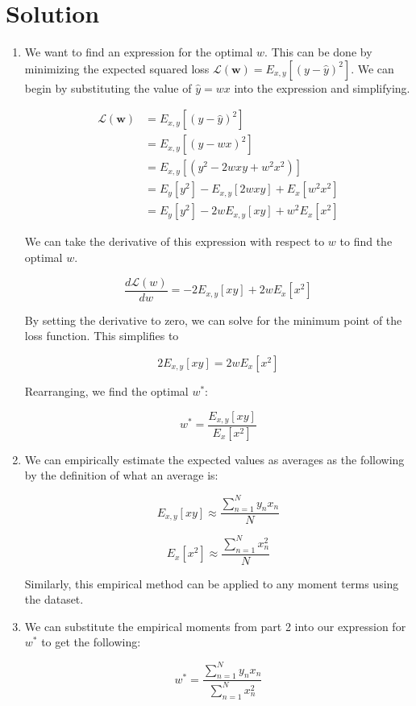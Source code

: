 \documentclass[submit]{../harvardml}
\newenvironment{solution}
  {\color{blue}\section*{Solution}}
{}
\begin{document}
\newpage
\begin{solution}
	\begin{enumerate}
	    \item We want to find an expression for the optimal $w$. This can be done by minimizing the expected squared loss $\mathcal{L}(\bm w) = E_{x,y}[ ( y - \hat{y} )^2]$. We can begin by substituting the value of $\hat{y}=wx$ into the expression and simplifying.

        \begin{align*}
            \mathcal{L}(\bm w) &= E_{x,y}[ ( y - \hat{y} )^2] \\
            &=E_{x,y}[ ( y - wx )^2]\\
            &= E_{x,y}[(y^2 - 2wxy + w^2x^2)]\\
            &= E_y[y^2] - E_{x,y}[2wxy] + E_x[w^2x^2] \\
            &= E_y[y^2] - 2wE_{x,y}[xy] + w^2E_x[x^2]
        \end{align*}

        We can take the derivative of this expression with respect to $w$ to find the optimal $w$.

        \[
        \frac{d\mathcal{L}(w)}{dw} = - 2E_{x,y}[xy] + 2wE_x[x^2]
        \]

        By setting the derivative to zero, we can solve for the minimum point of the loss function. This simplifies to

        \[
        2E_{x,y}[xy] = 2wE_x[x^2]
        \]

        Rearranging, we find the optimal $w^*$:

        \[
        \boxed{w^* = \frac{E_{x,y}[xy]}{E_x[x^2]}}
        \]

        \item We can empirically estimate the expected values as averages as the following by the definition of what an average is:

        \[
        \boxed{E_{x,y}[xy] \approx \frac{\sum_{n=1}^N y_n x_n}{N}}
        \]

        \[
        \boxed{E_x[x^2] \approx \frac{\sum_{n=1}^N x_n^2}{N}}
        \]

        Similarly, this empirical method can be applied to any moment terms using the dataset.

        
        \item We can substitute the empirical moments from part 2 into our expression for $w^*$ to get the following:

        \[
        w^* = \frac{\sum_{n=1}^N y_n x_n}{\sum_{n=1}^N x_n^2}
        \]


\end{enumerate}
\end{solution}
\end{document}
